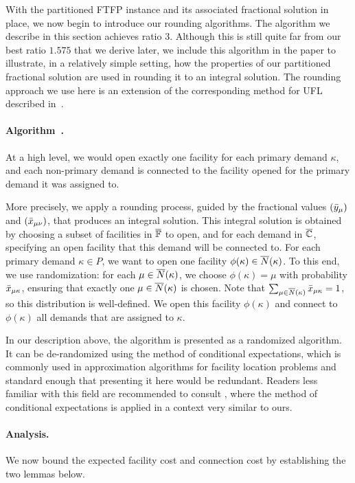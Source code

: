 \documentclass[11pt]{article}
\begin{document}
With the partitioned FTFP instance and its associated
fractional solution in place, we now begin to introduce our rounding algorithms.
The algorithm we describe in this section achieves ratio
$3$. Although this is still quite far from our best ratio $1.575$ that
we derive later, we include this algorithm in the paper to illustrate,
in a relatively simple setting, how the properties of our partitioned fractional
solution are used in rounding it to an integral solution.
The rounding approach we use here is an extension of the corresponding
method for UFL described in~\cite{gupta08}.

\paragraph{Algorithm~{\EGUP.}}
At a high level, we would open exactly one facility for each
primary demand $\kappa$, and each non-primary demand is
connected to the facility opened for the primary demand it
was assigned to.

More precisely, we apply a rounding process, guided by the
fractional values $({\bar y}_{\mu})$ and $({\bar x}_{\mu\nu})$,
that produces an integral solution. This integral solution
is obtained by choosing a subset of facilities in
$\overline{\mathbb{F}}$ to open, and for each demand in $\overline{\mathbb{C}}$,
specifying an open facility that this demand will be
connected to.  For each primary demand $\kappa\in P$, we
want to open one facility $\phi(\kappa) \in
{\overline{N}}(\kappa)$. To this end, we use randomization: for each
$\mu\in{\overline{N}}(\kappa)$, we choose $\phi(\kappa) = \mu$ with
probability ${\bar x}_{\mu\kappa}$, ensuring that exactly one
$\mu \in {\overline{N}}(\kappa)$ is chosen. Note that
$\sum_{\mu\in{\overline{N}}(\kappa)}{\bar x}_{\mu\kappa}=1$, so this
distribution is well-defined.  We open this facility
$\phi(\kappa)$ and connect to $\phi(\kappa)$ all demands
that are assigned to $\kappa$.

In our description above, the algorithm is presented as a
randomized algorithm. It can be de-randomized using the
method of conditional expectations, which is commonly used
in approximation algorithms for facility location problems
and standard enough that presenting it here would be
redundant. Readers less familiar with this field are
recommended to consult \cite{ChudakS04}, where the method of
conditional expectations is applied in a context very
similar to ours.


\paragraph{Analysis.}
We now bound the expected facility cost and connection cost
by establishing the two lemmas below.
\end{document}
